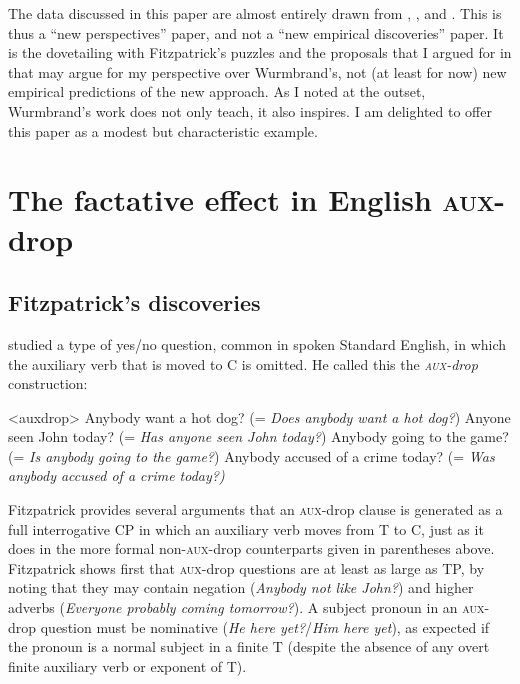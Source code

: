 \documentclass[output=paper]{langscibook}
\begin{document}
The data discussed in this paper are almost entirely drawn from \citet{fitzpatrick2006deletion}, \citet{Pesetsky:2019aa}, and \citet{Wurmbrand:2014aa}. This is thus a “new perspectives” paper, and not a “new empirical discoveries” paper. It is the dovetailing with Fitzpatrick's puzzles and the proposals that I argued for in \citet{Pesetsky:2019aa} that may argue for my perspective over Wurmbrand's, not (at least for now) new empirical predictions of the new approach. As I noted at the outset, Wurmbrand's work does not only teach, it also inspires. I am delighted to offer this paper as a modest but characteristic example.

\section{The factative effect in English  \textsc{aux-}drop}

\subsection{Fitzpatrick's discoveries}

\citet{fitzpatrick2006deletion} studied a type of yes/no question, common in spoken Standard English, in which the auxiliary verb that is moved to C is omitted. He called this the \textit{\textsc{aux}-drop} construction: 

\pex<auxdrop>
\a Anybody want a hot dog? (= \emph{Does anybody want a hot dog?}) 
\a Anyone seen John today? (= \emph{Has anyone seen John today?})
\a Anybody going to the game? (= \emph{Is anybody going to the game?})
\a Anybody accused of a crime today? (= \emph{Was anybody accused of a crime today?)}
\xe

\noindent Fitzpatrick provides several arguments that an \textsc{aux}-drop clause is generated as a full interrogative CP in which an auxiliary verb moves from T to C, just as it does in the more formal non-\textsc{aux-}drop counterparts given in parentheses above. Fitzpatrick shows first that \textsc{aux}-drop questions are at least as large as TP, by noting that they may contain negation (\textit{Anybody not like John?}) and higher adverbs (\textit{Everyone probably coming tomorrow?}). A subject pronoun in an \textsc{aux}-drop question must be nominative (\textit{He here yet?}\slash\relax*\textit{Him here yet}), as expected if the pronoun is a normal subject in a finite T (despite the absence of any overt finite auxiliary verb or exponent of T). 
\end{document}
